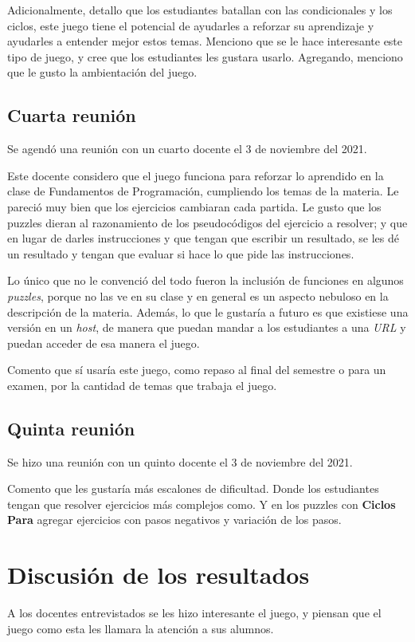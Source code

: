 Adicionalmente, detallo que los estudiantes batallan con las condicionales y los ciclos, este juego tiene el potencial de ayudarles a reforzar su aprendizaje y ayudarles a entender mejor estos temas. Menciono que se le hace interesante este tipo de juego, y cree que los estudiantes les gustara usarlo. Agregando, menciono que le gusto la ambientación del juego.

\subsection{Cuarta reunión}
Se agendó una reunión con un cuarto docente el 3 de noviembre del 2021. 

Este docente considero que el juego funciona para reforzar lo aprendido en la clase de Fundamentos de Programación, cumpliendo los temas de la materia. Le pareció muy bien que los ejercicios cambiaran cada partida. Le gusto que los puzzles dieran al razonamiento de los pseudocódigos del ejercicio a resolver; y que en lugar de darles instrucciones y que tengan que escribir un resultado, se les dé un resultado y tengan que evaluar si hace lo que pide las instrucciones.

Lo único que no le convenció del todo fueron la inclusión de funciones en algunos \textit{puzzles}, porque no las ve en su clase y en general es un aspecto nebuloso en la descripción de la materia. Además, lo que le gustaría a futuro es que existiese una versión en un \textit{host}, de manera que puedan mandar a los estudiantes a una \textit{URL} y puedan acceder de esa manera el juego.

Comento que sí usaría este juego, como repaso al final del semestre o para un examen, por la cantidad de temas que trabaja el juego.

\subsection{Quinta reunión}
Se hizo una reunión con un quinto docente el 3 de noviembre del 2021.

Comento que les gustaría más escalones de dificultad. Donde los estudiantes tengan que resolver ejercicios más complejos como. Y en los puzzles con \textbf{Ciclos Para} agregar ejercicios con pasos negativos y variación de los pasos.

\section{Discusión de los resultados}
A los docentes entrevistados se les hizo interesante el juego, y piensan que el juego como esta les llamara la atención a sus alumnos.

